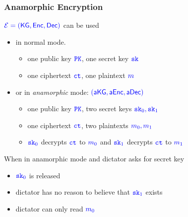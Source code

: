 \documentclass[]{beamer}
\newcommand{\calE}{\mathcal{E}}    %
\newcommand{\algofont}[1]{{\mathsf{#1}}}
\newcommand{\objfont}[1]{{\mathtt{#1}}}
\newcommand{\kg}{\algofont{KG}}
\newcommand{\enc}{\algofont{Enc}}
\newcommand{\dec}{\algofont{Dec}}
\newcommand{\akg}{\algofont{a}\kg}
\newcommand{\aenc}{\algofont{a}\enc}
\newcommand{\adec}{\algofont{a}\dec}
\newcommand{\ct}{\objfont{ct}}      %
\newcommand{\pk}{\objfont{PK}}      %
\newcommand{\sk}{\objfont{sk}}      %
\begin{document}
\begin{frame}
\frametitle{Anamorphic Encryption}

$\color{blue} \calE=(\kg,\enc,\dec)$ can be used 
\begin{itemize}
\item in normal mode. 
        \begin{itemize}
            \item one public key $\color{blue} \pk$, one secret key $\color{blue} \sk$
            \item one ciphertext $\color{blue} \ct$, one plaintext $\color{blue} m$
        \end{itemize}
\pause
\item or in {\em anamorphic} mode: $\color{blue} (\akg,\aenc,\adec)$
        \begin{itemize}
            \item one public key $\color{blue} \pk$, {\color{purple} two} secret keys 
                    $\color{blue} \sk_0,\sk_1$
            \item one ciphertext $\color{blue} \ct$, {\color{purple} two} plaintexts 
                    $\color{blue} m_0,m_1$
            \item $\color{blue} \sk_0$ decrypts $\color{blue} \ct$ 
                    to $\color{blue} m_0$ and
                  $\color{blue} \sk_1$ decrypts $\color{blue} \ct$ 
                    to $\color{blue} m_1$ 
        \end{itemize}
\end{itemize}

\pause

When in anamorphic mode and dictator asks for secret key
    \begin{itemize}
        \item $\color{blue} \sk_0$ is released
        \item dictator has no reason to believe that $\color{blue} \sk_1$
            exists
        \item dictator can only read $\color{blue} m_0$
    \end{itemize}

\end{frame}
\end{document}
